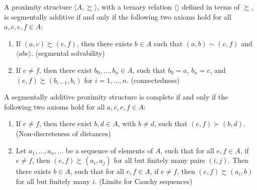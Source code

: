 \begin{defi}
A proximity structure $\langle A, \succsim \rangle$, with a ternary relation $\langle \rangle$ defined in terms of $\succsim$, is segmentally additive if and only if the following two axioms hold for all $a, c, e, f \in A$:

\begin{enumerate}
    \item If $(a, c) \succsim (e, f)$, then there exists $b \in A$ such that $(a, b) \sim (e, f)$ and $\langle abc \rangle$. (segmental solvability)
    \item If $e \neq f$, then there exist $b_0, \ldots, b_n \in A$, such that $b_0 = a$, $b_n = c$, and $(e, f) \succsim (b_{i-1}, b_i)$ for $i = 1, \ldots, n$. (connectedness)
\end{enumerate}

A segmentally additive proximity structure is complete if and only if the following two axioms hold for all $a, c, e, f \in A$:

\begin{enumerate}
    \item[3.] If $e \neq f$, then there exist $b, d \in A$, with $b \neq d$, such that $(e, f) \succ (b, d)$. (Non-discreteness of distances)
    \item[4.] Let $a_1, \ldots, a_n, \ldots$ be a sequence of elements of $A$, such that for all $e, f \in A$, if $e \neq f$, then $(e, f) \succsim (a_i, a_j)$ for all but finitely many pairs $(i, j)$. Then there exists $b \in A$, such that for all $e, f \in A$, if $e \neq f$, then $(e, f) \succsim (a_i, b)$ for all but finitely many $i$. (Limits for Cauchy sequences)
\end{enumerate}

\end{defi}


